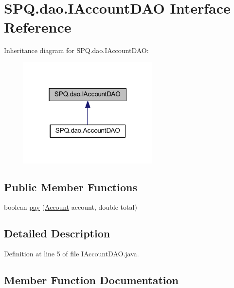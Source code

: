 \hypertarget{interface_s_p_q_1_1dao_1_1_i_account_d_a_o}{}\section{S\+P\+Q.\+dao.\+I\+Account\+D\+AO Interface Reference}
\label{interface_s_p_q_1_1dao_1_1_i_account_d_a_o}


Inheritance diagram for S\+P\+Q.\+dao.\+I\+Account\+D\+AO\+:\nopagebreak
\begin{figure}[H]
\begin{center}
\leavevmode
\includegraphics[width=199pt]{interface_s_p_q_1_1dao_1_1_i_account_d_a_o__inherit__graph}
\end{center}
\end{figure}
\subsection*{Public Member Functions}
\begin{DoxyCompactItemize}
\item 
boolean \mbox{\hyperlink{interface_s_p_q_1_1dao_1_1_i_account_d_a_o_aa1e3f13d419f23fc0cb5c98cd4cc5eb4}{pay}} (\mbox{\hyperlink{class_s_p_q_1_1data_1_1_account}{Account}} account, double total)
\end{DoxyCompactItemize}


\subsection{Detailed Description}


Definition at line 5 of file I\+Account\+D\+A\+O.\+java.



\subsection{Member Function Documentation}
\mbox{\label{interface_s_p_q_1_1dao_1_1_i_account_d_a_o_aa1e3f13d419f23fc0cb5c98cd4cc5eb4}} 
